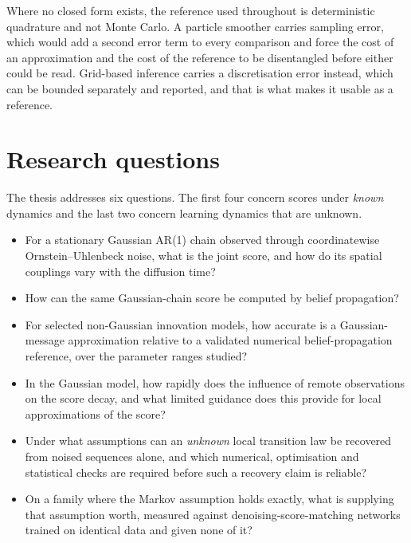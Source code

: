 Where no closed form exists, the reference used throughout is
deterministic quadrature and not Monte Carlo. A particle smoother carries
sampling error, which would add a second error term to every comparison and
force the cost of an approximation and the cost of the reference to be
disentangled before either could be read. Grid-based inference carries a
discretisation error instead, which can be bounded separately and reported,
and that is what makes it usable as a reference.

\section{Research questions}\label{sec:rq}

The thesis addresses six questions. The first four concern scores under
\emph{known} dynamics and the last two concern learning dynamics that are
unknown.

\begin{itemize}
  \item[\textbf{RQ1.}] For a stationary Gaussian AR(1) chain observed
  through coordinatewise Ornstein--Uhlenbeck noise, what is the joint
  score, and how do its spatial couplings vary with the diffusion time?

  \item[\textbf{RQ2.}] How can the same Gaussian-chain score be computed
  by belief propagation?

  \item[\textbf{RQ3.}] For selected non-Gaussian innovation models, how
  accurate is a Gaussian-message approximation relative to a validated
  numerical belief-propagation reference, over the parameter ranges
  studied?

  \item[\textbf{RQ4.}] In the Gaussian model, how rapidly does the
  influence of remote observations on the score decay, and what limited
  guidance does this provide for local approximations of the score?

  \item[\textbf{RQ5.}] Under what assumptions can an \emph{unknown} local
  transition law be recovered from noised sequences alone, and which
  numerical, optimisation and statistical checks are required before such
  a recovery claim is reliable?

  \item[\textbf{RQ6.}] On a family where the Markov assumption holds
  exactly, what is supplying that assumption worth, measured against
  denoising-score-matching networks trained on identical data and given
  none of it?
\end{itemize}

